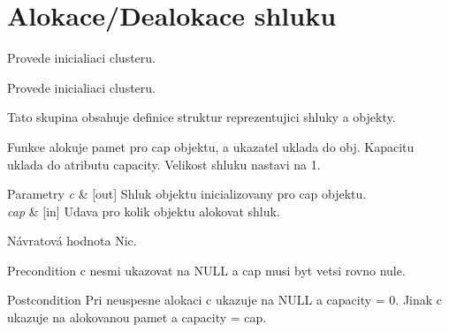 \hypertarget{group__Pamet}{}\section{Alokace/\+Dealokace shluku}
\label{group__Pamet}


Provede inicialiaci clusteru.  


Provede inicialiaci clusteru. 

Tato skupina obsahuje definice struktur reprezentujici shluky a objekty.

Funkce alokuje pamet pro \textquotesingle{}cap\textquotesingle{} objektu, a ukazatel uklada do \textquotesingle{}obj\textquotesingle{}. Kapacitu uklada do atributu \textquotesingle{}capacity\textquotesingle{}. Velikost shluku nastavi na 1.


\begin{DoxyParams}{Parametry}
{\em c} & \mbox{[}out\mbox{]} Shluk objektu inicializovany pro \textquotesingle{}cap\textquotesingle{} objektu. \\
\hline
{\em cap} & \mbox{[}in\mbox{]} Udava pro kolik objektu alokovat shluk. \\
\hline
\end{DoxyParams}
\begin{DoxyReturn}{Návratová hodnota}
Nic.
\end{DoxyReturn}
\begin{DoxyPrecond}{Precondition}
\textquotesingle{}c\textquotesingle{} nesmi ukazovat na \textquotesingle{}N\+U\+LL\textquotesingle{} a \textquotesingle{}cap\textquotesingle{} musi byt vetsi rovno nule. 
\end{DoxyPrecond}
\begin{DoxyPostcond}{Postcondition}
Pri neuspesne alokaci \textquotesingle{}c\textquotesingle{} ukazuje na N\+U\+LL a \textquotesingle{}capacity\textquotesingle{} = 0. Jinak \textquotesingle{}c\textquotesingle{} ukazuje na alokovanou pamet a \textquotesingle{}capacity\textquotesingle{} = \textquotesingle{}cap\textquotesingle{}. 
\end{DoxyPostcond}
